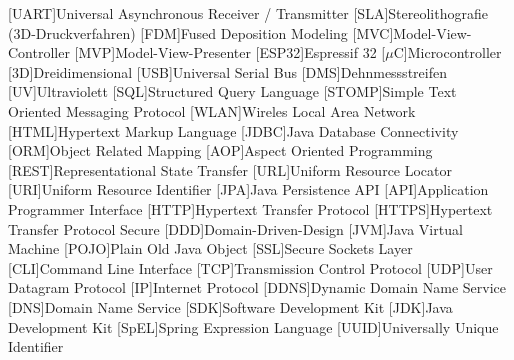 
\begin{acronym}[ACRONYM]
[UART]{Universal Asynchronous Receiver / Transmitter}
[SLA]{Stereolithografie (3D-Druckverfahren)}
[FDM]{Fused Deposition Modeling}
[MVC]{Model-View-Controller}
[MVP]{Model-View-Presenter}
[ESP32]{Espressif 32}
[$\mu$C]{Microcontroller}
[3D]{Dreidimensional}
[USB]{Universal Serial Bus}
[DMS]{Dehnmessstreifen}
[UV]{Ultraviolett}
[SQL]{Structured Query Language}
[STOMP]{Simple Text Oriented Messaging Protocol}
[WLAN]{Wireles Local Area Network}
[HTML]{Hypertext Markup Language}
[JDBC]{Java Database Connectivity}
[ORM]{Object Related Mapping}
[AOP]{Aspect Oriented Programming}
[REST]{Representational State Transfer}
[URL]{Uniform Resource Locator}
[URI]{Uniform Resource Identifier}
[JPA]{Java Persistence API}
[API]{Application Programmer Interface}
[HTTP]{Hypertext Transfer Protocol}
[HTTPS]{Hypertext Transfer Protocol Secure}
[DDD]{Domain-Driven-Design}
[JVM]{Java Virtual Machine}
[POJO]{Plain Old Java Object}
[SSL]{Secure Sockets Layer}
[CLI]{Command Line Interface}
[TCP]{Transmission Control Protocol}
[UDP]{User Datagram Protocol}
[IP]{Internet Protocol}
[DDNS]{Dynamic Domain Name Service}
[DNS]{Domain Name Service}
[SDK]{Software Development Kit}
[JDK]{Java Development Kit}
[SpEL]{Spring Expression Language}
[UUID]{Universally Unique Identifier}
\end{acronym}\newpage

